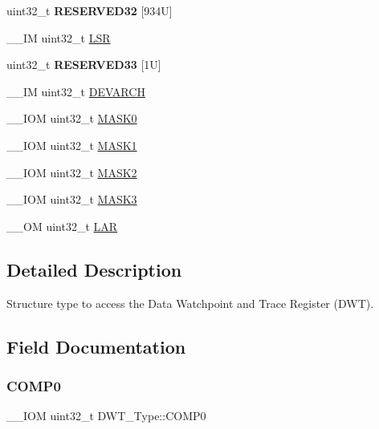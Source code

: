 \begin{DoxyCompactItemize}
uint32\+\_\+t {\bfseries R\+E\+S\+E\+R\+V\+E\+D32} \mbox{[}934\+U\mbox{]}
\item 
\+\_\+\+\_\+\+IM uint32\+\_\+t \hyperlink{struct_d_w_t___type_a4281befcc19ee69afdd50801cb1c9bcf}{L\+SR}
\item 
\mbox{\label{struct_d_w_t___type_a23488c27be43c80c8c1dfd17aac9c28d}} 
uint32\+\_\+t {\bfseries R\+E\+S\+E\+R\+V\+E\+D33} \mbox{[}1\+U\mbox{]}
\item 
\+\_\+\+\_\+\+IM uint32\+\_\+t \hyperlink{struct_d_w_t___type_ae60dbff3143d15cd04ac984084d8fbc7}{D\+E\+V\+A\+R\+CH}
\item 
\+\_\+\+\_\+\+I\+OM uint32\+\_\+t \hyperlink{struct_d_w_t___type_a821eb5e71f340ec077efc064cfc567db}{M\+A\+S\+K0}
\item 
\+\_\+\+\_\+\+I\+OM uint32\+\_\+t \hyperlink{struct_d_w_t___type_aabf94936c9340e62fed836dcfb152405}{M\+A\+S\+K1}
\item 
\+\_\+\+\_\+\+I\+OM uint32\+\_\+t \hyperlink{struct_d_w_t___type_a00ac4d830dfe0070a656cda9baed170f}{M\+A\+S\+K2}
\item 
\+\_\+\+\_\+\+I\+OM uint32\+\_\+t \hyperlink{struct_d_w_t___type_a2a509d8505c37a3b64f6b24993df5f3f}{M\+A\+S\+K3}
\item 
\+\_\+\+\_\+\+OM uint32\+\_\+t \hyperlink{struct_d_w_t___type_a4b8037802a3b25e367f0977d86f754ad}{L\+AR}
\end{DoxyCompactItemize}


\subsection{Detailed Description}
Structure type to access the Data Watchpoint and Trace Register (D\+WT). 

\subsection{Field Documentation}
\mbox{\label{struct_d_w_t___type_a61c2965af5bc0643f9af65620b0e67c9}} 
\subsubsection{\texorpdfstring{C\+O\+M\+P0}{COMP0}}
{\footnotesize\ttfamily \+\_\+\+\_\+\+I\+OM uint32\+\_\+t D\+W\+T\+\_\+\+Type\+::\+C\+O\+M\+P0}

